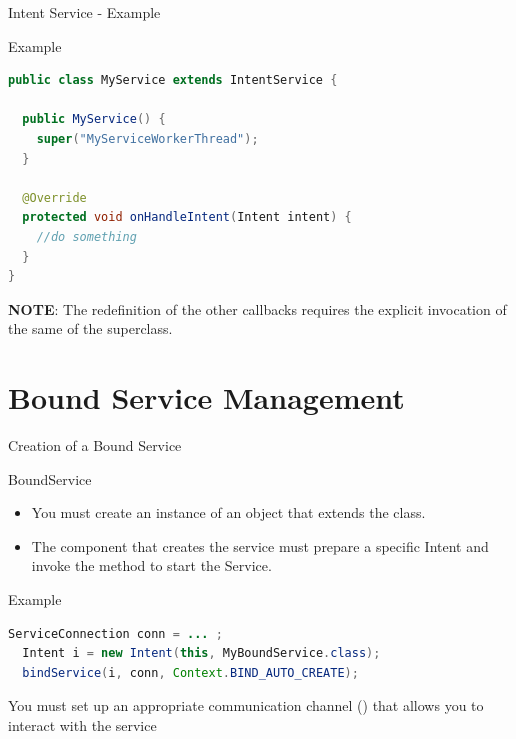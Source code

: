 \documentclass{beamer}
\begin{document}
  \begin{frame}[fragile]{Intent Service - Example}
    \begin{exampleblock}{Example}
      \begin{lstlisting}[language=Java]  		        
public class MyService extends IntentService {

  public MyService() {
    super("MyServiceWorkerThread");
  }

  @Override
  protected void onHandleIntent(Intent intent) {
    //do something
  }
}
      \end{lstlisting}
    \end{exampleblock}
    \textbf{NOTE}: The redefinition of the other callbacks requires the explicit
    invocation of the same of the superclass.
  \end{frame}

\section{Bound Service Management}
  \begin{frame}[fragile]{Creation of a Bound Service}
    \begin{block}{BoundService}
      \begin{itemize}\itemsep10pt
        \item You must create an instance of an object that extends the
         class.
        \item The component that creates the service must prepare a specific
        Intent and invoke the  method to start the Service.
      \end{itemize}
    \end{block}
    \begin{exampleblock}{Example}
      \begin{lstlisting}[language=Java]
  ServiceConnection conn = ... ;
  Intent i = new Intent(this, MyBoundService.class);
  bindService(i, conn, Context.BIND_AUTO_CREATE);
      \end{lstlisting}
    \end{exampleblock}
    \small You must set up an appropriate communication channel () that
     allows you to interact with the service
  \end{frame}
\end{document}
